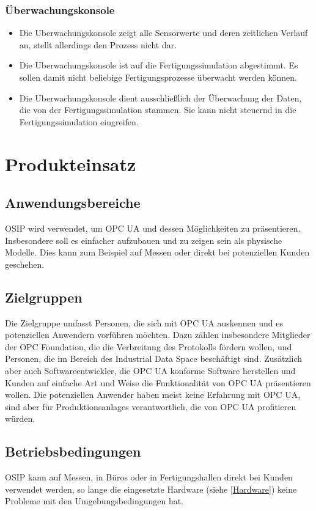 \documentclass[parskip=full]{scrartcl}
\begin{document}
\subsubsection{Überwachungskonsole}
\begin{itemize}
  \item Die \gls{Uberwachungskonsole} zeigt alle Sensorwerte und deren zeitlichen Verlauf an, stellt allerdings den Prozess nicht dar.
  \item Die \gls{Uberwachungskonsole} ist auf die \gls{Fertigungssimulation} abgestimmt. Es sollen damit nicht beliebige
    Fertigungsprozesse \"uberwacht werden k\"onnen.
  \item Die \gls{Uberwachungskonsole} dient ausschlie{\ss}lich der \"Uberwachung der Daten, die von der \gls{Fertigungssimulation}
    stammen. Sie kann nicht steuernd in die \gls{Fertigungssimulation} eingreifen.
\end{itemize}

\newpage
\section{Produkteinsatz}
\subsection{Anwendungsbereiche}
OSIP wird verwendet, um \gls{OPC UA} und dessen Möglichkeiten zu präsentieren.
Insbesondere soll es einfacher aufzubauen und zu zeigen sein als physische Modelle.
Dies kann zum Beispiel auf Messen oder direkt bei potenziellen Kunden geschehen.

\subsection{Zielgruppen}
Die Zielgruppe umfasst Personen, die sich mit \gls{OPC UA} auskennen und es potenziellen Anwendern vorführen möchten.
Dazu zählen insbesondere Mitglieder der OPC Foundation, die die Verbreitung des Protokolls fördern wollen, und Personen,
die im Bereich des \gls{Industrial Data Space} beschäftigt sind.
Zusätzlich aber auch Softwareentwickler, die \gls{OPC UA} konforme Software herstellen und Kunden auf einfache Art und
Weise die Funktionalität von \gls{OPC UA} präsentieren wollen.
Die potenziellen Anwender haben meist keine Erfahrung mit \gls{OPC UA}, sind aber für \glspl{Produktionsanlage} verantwortlich,
die von \gls{OPC UA} profitieren würden.

\subsection{Betriebsbedingungen}
OSIP kann auf Messen, in Büros oder in Fertigungshallen direkt bei Kunden verwendet werden,
so lange die eingesetzte Hardware (siehe \ref{Hardware}) keine Probleme mit den Umgebungsbedingungen hat.
\end{document}
